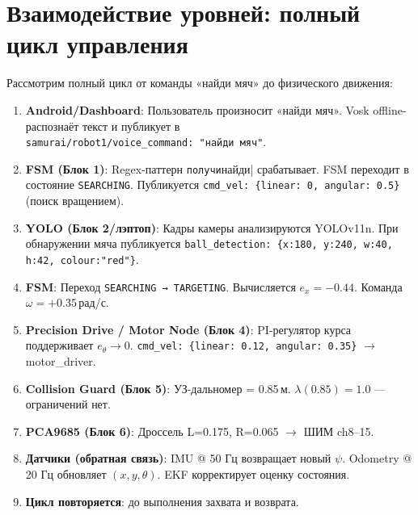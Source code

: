 \documentclass[12pt, a4paper]{article}
\begin{document}
\newpage
\section{Взаимодействие уровней: полный цикл управления}
\label{sec:integration}

Рассмотрим полный цикл от команды «найди мяч» до физического движения:

\begin{enumerate}
  \item \textbf{Android/Dashboard}: Пользователь произносит «найди мяч».
    Vosk offline-распознаёт текст и публикует в\\
    \texttt{samurai/robot1/voice\_command: "найди мяч"}.

  \item \textbf{FSM (Блок 1)}: Regex-паттерн \verb|получи|найди| срабатывает.
    FSM переходит в состояние \texttt{SEARCHING}.
    Публикуется \texttt{cmd\_vel: \{linear: 0, angular: 0.5\}} (поиск вращением).

  \item \textbf{YOLO (Блок 2/лэптоп)}: Кадры камеры анализируются YOLOv11n.
    При обнаружении мяча публикуется \texttt{ball\_detection: \{x:180, y:240, w:40, h:42, colour:"red"\}}.

  \item \textbf{FSM}: Переход \texttt{SEARCHING → TARGETING}.
    Вычисляется $e_x = -0.44$. Команда $\omega = +0.35$\,рад/с.

  \item \textbf{Precision Drive / Motor Node (Блок 4)}: PI-регулятор курса
    поддерживает $e_\theta \to 0$.
    \texttt{cmd\_vel: \{linear: 0.12, angular: 0.35\}} $\to$ motor\_driver.

  \item \textbf{Collision Guard (Блок 5)}: УЗ-дальномер = 0.85\,м.
    $\lambda(0.85) = 1.0$ — ограничений нет.

  \item \textbf{PCA9685 (Блок 6)}: Дроссель L=0.175, R=0.065 $\to$ ШИМ ch8–15.

  \item \textbf{Датчики (обратная связь)}: IMU @ 50 Гц возвращает новый $\psi$.
    Odometry @ 20 Гц обновляет $(x, y, \theta)$.
    EKF корректирует оценку состояния.

  \item \textbf{Цикл повторяется}: до выполнения захвата и возврата.
\end{enumerate}
\end{document}
